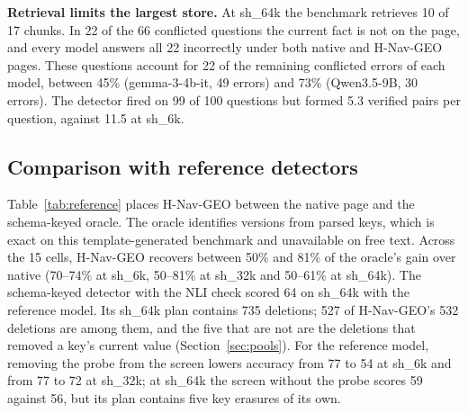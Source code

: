 \documentclass[journal=jcisd8,manuscript=article]{achemso}
\newcommand{\sub}[1]{\textsf{sh\_#1}}                    %
\newcommand{\geo}{H-Nav-GEO}
\begin{document}
\textbf{Retrieval limits the largest store.} At \sub{64k} the benchmark retrieves 10 of 17 chunks. In 22 of the 66 conflicted questions the current fact is not on the page, and every model answers all 22 incorrectly under both native and \geo{} pages. These questions account for 22 of the remaining conflicted errors of each model, between 45\% (gemma-3-4b-it, 49 errors) and 73\% (Qwen3.5-9B, 30 errors). The detector fired on 99 of 100 questions but formed 5.3 verified pairs per question, against 11.5 at \sub{6k}.

\subsection{Comparison with reference detectors}
\label{sec:reference}

Table~\ref{tab:reference} places \geo{} between the native page and the schema-keyed oracle. The oracle identifies versions from parsed keys, which is exact on this template-generated benchmark and unavailable on free text. Across the 15 cells, \geo{} recovers between 50\% and 81\% of the oracle's gain over native (70--74\% at \sub{6k}, 50--81\% at \sub{32k} and 50--61\% at \sub{64k}). The schema-keyed detector with the NLI check scored 64 on \sub{64k} with the reference model. Its \sub{64k} plan contains 735 deletions; 527 of \geo{}'s 532 deletions are among them, and the five that are not are the deletions that removed a key's current value (Section~\ref{sec:pools}). For the reference model, removing the probe from the screen lowers accuracy from 77 to 54 at \sub{6k} and from 77 to 72 at \sub{32k}; at \sub{64k} the screen without the probe scores 59 against 56, but its plan contains five key erasures of its own.
\end{document}

